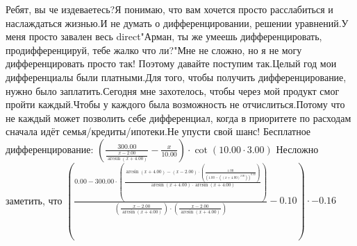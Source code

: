 Ребят, вы че издеваетесь?Я понимаю, что вам хочется просто расслабиться и наслаждаться жизнью.И не думать о дифференцировании, решении уравнений.У меня просто завален весь direct"Арман, ты же умеешь дифференцировать, продифференцируй, тебе жалко что ли?"Мне не сложно, но я не могу дифференцировать просто так! Поэтому давайте поступим так.Целый год мои дифференциалы были платными.Для того, чтобы получить дифференцирование, нужно было заплатить.Сегодня мне захотелось, чтобы через мой продукт смог пройти каждый.Чтобы у каждого была возможность не отчислиться.Потому что не каждый может позволить себе дифференциал, когда в приоритете по расходам сначала идёт семья/кредиты/ипотеки.Не упусти свой шанс! Бесплатное дифференцирование: 
$(\frac {300.00 }{\frac {x - 2.00 }{\arcsin (x + 4.00 )}}- \frac {x }{10.00 })\cdot \cot (10.00 \cdot 3.00 )$
Несложно заметить, что
$(\frac {0.00 - 300.00 \cdot (\frac {\arcsin (x + 4.00 )- (x - 2.00 )\cdot (\frac {1.00 }{(1.00 - ((x + 4.00 )^ {2.00 }))^ {0.50 }})}{\arcsin (x + 4.00 )\cdot \arcsin (x + 4.00 )})}{(\frac {x - 2.00 }{\arcsin (x + 4.00 )})\cdot (\frac {x - 2.00 }{\arcsin (x + 4.00 )})}- 0.10 )\cdot -0.16 $
